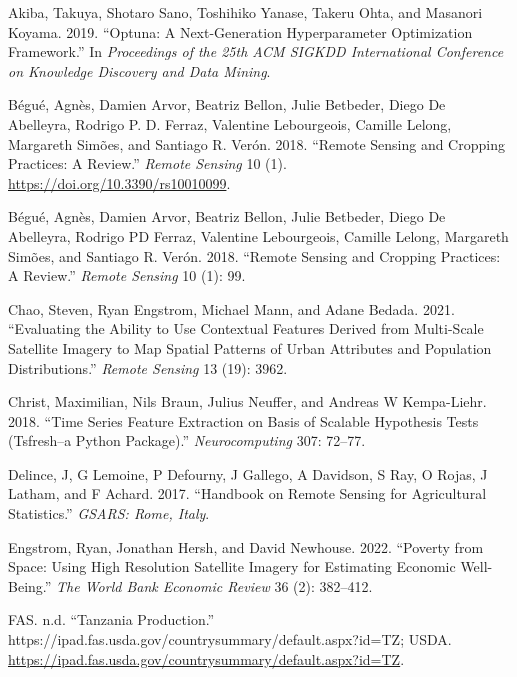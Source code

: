 \documentclass[
]{article}
\newlength{\cslhangindent}
\newlength{\cslentryspacingunit} %
\newenvironment{CSLReferences}[2] %
 {%
  \setlength{\parindent}{0pt}
  \ifodd #1
  \let\oldpar\par
  \def\par{\hangindent=\cslhangindent\oldpar}
  \fi
  \setlength{\parskip}{#2\cslentryspacingunit}
 }%
 {}
\begin{document}
\hypertarget{refs}{}
\begin{CSLReferences}{1}{0}
\leavevmode{}%
Akiba, Takuya, Shotaro Sano, Toshihiko Yanase, Takeru Ohta, and Masanori
Koyama. 2019. {``Optuna: A Next-Generation Hyperparameter Optimization
Framework.''} In \emph{Proceedings of the 25th {ACM} {SIGKDD}
International Conference on Knowledge Discovery and Data Mining}.

\leavevmode{}%
Bégué, Agnès, Damien Arvor, Beatriz Bellon, Julie Betbeder, Diego De
Abelleyra, Rodrigo P. D. Ferraz, Valentine Lebourgeois, Camille Lelong,
Margareth Simões, and Santiago R. Verón. 2018. {``Remote Sensing and
Cropping Practices: A Review.''} \emph{Remote Sensing} 10 (1).
\url{https://doi.org/10.3390/rs10010099}.

\leavevmode{}%
Bégué, Agnès, Damien Arvor, Beatriz Bellon, Julie Betbeder, Diego De
Abelleyra, Rodrigo PD Ferraz, Valentine Lebourgeois, Camille Lelong,
Margareth Simões, and Santiago R. Verón. 2018. {``Remote Sensing and
Cropping Practices: A Review.''} \emph{Remote Sensing} 10 (1): 99.

\leavevmode{}%
Chao, Steven, Ryan Engstrom, Michael Mann, and Adane Bedada. 2021.
{``Evaluating the Ability to Use Contextual Features Derived from
Multi-Scale Satellite Imagery to Map Spatial Patterns of Urban
Attributes and Population Distributions.''} \emph{Remote Sensing} 13
(19): 3962.

\leavevmode{}%
Christ, Maximilian, Nils Braun, Julius Neuffer, and Andreas W
Kempa-Liehr. 2018. {``Time Series Feature Extraction on Basis of
Scalable Hypothesis Tests (Tsfresh--a Python Package).''}
\emph{Neurocomputing} 307: 72--77.

\leavevmode{}%
Delince, J, G Lemoine, P Defourny, J Gallego, A Davidson, S Ray, O
Rojas, J Latham, and F Achard. 2017. {``Handbook on Remote Sensing for
Agricultural Statistics.''} \emph{GSARS: Rome, Italy}.

\leavevmode{}%
Engstrom, Ryan, Jonathan Hersh, and David Newhouse. 2022. {``Poverty
from Space: Using High Resolution Satellite Imagery for Estimating
Economic Well-Being.''} \emph{The World Bank Economic Review} 36 (2):
382--412.

\leavevmode{}%
FAS. n.d. {``Tanzania Production.''}
https://ipad.fas.usda.gov/countrysummary/default.aspx?id=TZ; USDA.
\url{https://ipad.fas.usda.gov/countrysummary/default.aspx?id=TZ}.


\end{CSLReferences}
\end{document}
